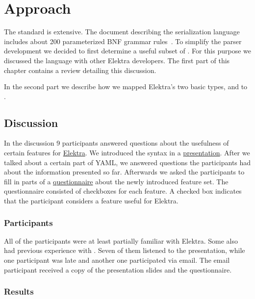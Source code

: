 \chapter{Approach}

The  standard is extensive. The document describing the serialization language includes about 200 parameterized \gls{BNF} grammar rules~\cite{ben2009yaml}. To simplify the parser development we decided to first determine a useful subset of . For this purpose we discussed the language with other Elektra developers. The first part of this chapter contains a review detailing this discussion.

In the second part we describe how we mapped Elektra’s two basic types,  and  to .

\section{Discussion}

In the discussion 9 participants answered questions about the usefulness of certain  features for \href{https://www.libelektra.org}{Elektra}. We introduced the  syntax in a \href{https://github.com/sanssecours/YAML-Presentation/releases/download/v1.0/Presentation.pdf}{presentation}. After we talked about a certain part of YAML, we answered questions the participants had about the information presented so far. Afterwards we asked the participants to fill in parts of a \href{https://github.com/sanssecours/YAML-Presentation/blob/master/Questionnaire.md}{questionnaire} about the newly introduced feature set. The questionnaire consisted of checkboxes for each feature. A checked box indicates that the participant considers a feature useful for Elektra.

\subsection{Participants}

All of the participants were at least partially familiar with Elektra. Some also had previous experience with . Seven of them listened to the presentation, while one participant was late and another one participated via email. The email participant received a copy of the presentation slides and the questionnaire.

\subsection{Results}

